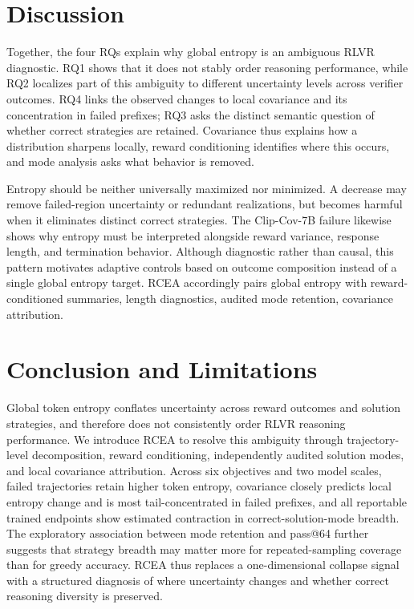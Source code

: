 \documentclass[letterpaper]{article} %
\begin{document}
\raggedbottom
\section{Discussion}

Together, the four RQs explain why global entropy is an ambiguous RLVR diagnostic. RQ1 shows that it does not stably order reasoning performance, while RQ2 localizes part of this ambiguity to different uncertainty levels across verifier outcomes. RQ4 links the observed changes to local covariance and its concentration in failed prefixes; RQ3 asks the distinct semantic question of whether correct strategies are retained. Covariance thus explains how a distribution sharpens locally, reward conditioning identifies where this occurs, and mode analysis asks what behavior is removed.

Entropy should be neither universally maximized nor minimized. A decrease may remove failed-region uncertainty or redundant realizations, but becomes harmful when it eliminates distinct correct strategies. The Clip-Cov-7B failure likewise shows why entropy must be interpreted alongside reward variance, response length, and termination behavior. Although diagnostic rather than causal, this pattern motivates adaptive controls based on outcome composition instead of a single global entropy target. RCEA accordingly pairs global entropy with reward-conditioned summaries, length diagnostics, audited mode retention, covariance attribution.

\section{Conclusion and Limitations}

Global token entropy conflates uncertainty across reward outcomes and solution strategies, and therefore does not consistently order RLVR reasoning performance. We introduce RCEA to resolve this ambiguity through trajectory-level decomposition, reward conditioning, independently audited solution modes, and local covariance attribution. Across six objectives and two model scales, failed trajectories retain higher token entropy, covariance closely predicts local entropy change and is most tail-concentrated in failed prefixes, and all reportable trained endpoints show estimated contraction in correct-solution-mode breadth. The exploratory association between mode retention and pass@64 further suggests that strategy breadth may matter more for repeated-sampling coverage than for greedy accuracy. RCEA thus replaces a one-dimensional collapse signal with a structured diagnosis of where uncertainty changes and whether correct reasoning diversity is preserved.
\end{document}
